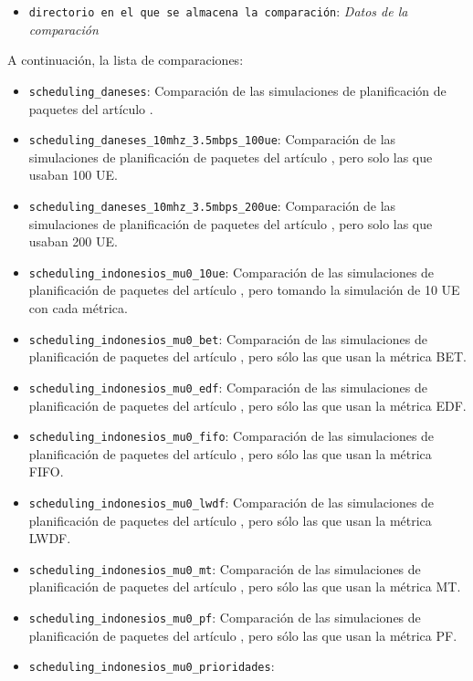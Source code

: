 \documentclass[12pt]{report} %
\begin{document}
\begin{itemize}
\item \verb|directorio en el que se almacena la comparación|: \textit{Datos de la comparación}
\end{itemize}

A continuación, la lista de comparaciones:

\begin{itemize}
\item \verb|scheduling_daneses|:
Comparación de las simulaciones de planificación de paquetes del artículo \cite{RefWorks:66}.
\item \verb|scheduling_daneses_10mhz_3.5mbps_100ue|:
Comparación de las simulaciones de planificación de paquetes del artículo \cite{RefWorks:66},
pero solo las que usaban 100 UE.
\item \verb|scheduling_daneses_10mhz_3.5mbps_200ue|:
Comparación de las simulaciones de planificación de paquetes del artículo \cite{RefWorks:66},
pero solo las que usaban 200 UE.
\item \verb|scheduling_indonesios_mu0_10ue|:
Comparación de las simulaciones de planificación de paquetes del artículo \cite{RefWorks:67},
pero tomando la simulación de 10 UE con cada métrica.
\item \verb|scheduling_indonesios_mu0_bet|:
Comparación de las simulaciones de planificación de paquetes del artículo \cite{RefWorks:67},
pero sólo las que usan la métrica BET.
\item \verb|scheduling_indonesios_mu0_edf|:
Comparación de las simulaciones de planificación de paquetes del artículo \cite{RefWorks:67},
pero sólo las que usan la métrica EDF.
\item \verb|scheduling_indonesios_mu0_fifo|:
Comparación de las simulaciones de planificación de paquetes del artículo \cite{RefWorks:67},
pero sólo las que usan la métrica FIFO.
\item \verb|scheduling_indonesios_mu0_lwdf|:
Comparación de las simulaciones de planificación de paquetes del artículo \cite{RefWorks:67},
pero sólo las que usan la métrica LWDF.
\item \verb|scheduling_indonesios_mu0_mt|:
Comparación de las simulaciones de planificación de paquetes del artículo \cite{RefWorks:67},
pero sólo las que usan la métrica MT.
\item \verb|scheduling_indonesios_mu0_pf|:
Comparación de las simulaciones de planificación de paquetes del artículo \cite{RefWorks:67},
pero sólo las que usan la métrica PF.
\item \verb|scheduling_indonesios_mu0_prioridades|:

\end{itemize}
\end{document}
